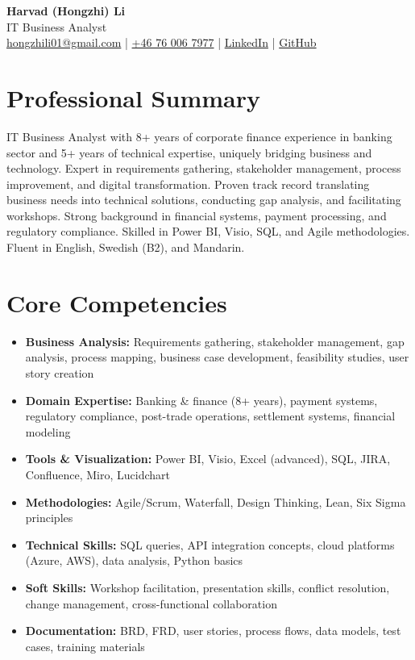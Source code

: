 \documentclass[11pt,a4paper]{article}
\begin{document}
\pagestyle{empty}

\begin{center}
{\LARGE \textbf{Harvad (Hongzhi) Li}}\\[10pt]
{\Large IT Business Analyst}\\[10pt]
\textcolor{linkedinblue}{\href{mailto:hongzhili01@gmail.com}{hongzhili01@gmail.com} | \href{tel:+46760067977}{+46 76 006 7977} | \href{https://www.linkedin.com/in/harvad/}{LinkedIn} | \href{https://github.com/bluehawana}{GitHub}}
\end{center}

\section*{Professional Summary}

IT Business Analyst with 8+ years of corporate finance experience in banking sector and 5+ years of technical expertise, uniquely bridging business and technology. Expert in requirements gathering, stakeholder management, process improvement, and digital transformation. Proven track record translating business needs into technical solutions, conducting gap analysis, and facilitating workshops. Strong background in financial systems, payment processing, and regulatory compliance. Skilled in Power BI, Visio, SQL, and Agile methodologies. Fluent in English, Swedish (B2), and Mandarin.

\section*{Core Competencies}

\begin{itemize}[leftmargin=*, itemsep=2pt]
\item \textbf{Business Analysis:} Requirements gathering, stakeholder management, gap analysis, process mapping, business case development, feasibility studies, user story creation
\item \textbf{Domain Expertise:} Banking \& finance (8+ years), payment systems, regulatory compliance, post-trade operations, settlement systems, financial modeling
\item \textbf{Tools \& Visualization:} Power BI, Visio, Excel (advanced), SQL, JIRA, Confluence, Miro, Lucidchart
\item \textbf{Methodologies:} Agile/Scrum, Waterfall, Design Thinking, Lean, Six Sigma principles
\item \textbf{Technical Skills:} SQL queries, API integration concepts, cloud platforms (Azure, AWS), data analysis, Python basics
\item \textbf{Soft Skills:} Workshop facilitation, presentation skills, conflict resolution, change management, cross-functional collaboration
\item \textbf{Documentation:} BRD, FRD, user stories, process flows, data models, test cases, training materials
\end{itemize}
\end{document}
